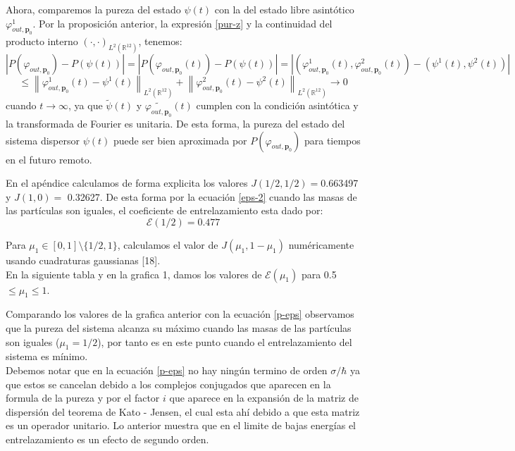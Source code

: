 \documentclass[12pt]{book}
\numberwithin{equation}{chapter}
\def\R{\mathbb{R}}
\def\E{\mathcal{E}}
\def\rar{\rightarrow}
\def\vp{\varphi}
\def\P{\mathbf{p}}
\begin{document}
Ahora, comparemos la pureza del estado $\psi(t)$ con la del estado libre asint\'otico $\vp_{out,\P_{0}}^{1}$. Por la proposici\'on anterior, la expresi\'on \eqref{pur-z} y la continuidad del producto interno $(\cdot , \cdot)_{ L^{2}(\R^{12}) }$, tenemos:
$$ \left|P(\vp_{out,\P_{0}}) - P(\psi(t)) \right| = \left| P(\vp_{out,\P_{0}}(t)) - P(\psi(t)) \right| = \left| (\vp_{out,\P_{0}}^{1}(t) , \vp_{out,\P_{0}}^{2}(t)) - (\psi^{1}(t),\psi^{2}(t)) \right| $$
$$ \leq \left\| \vp_{out,\P_{0}}^{1}(t) - \psi^{1}(t) \right\|_{L^{2}(\R^{12})} + \left\| \vp_{out,\P_{0}}^{2}(t) -  \psi^{2}(t) \right\|_{L^{2}(\R^{12})} \rar 0 $$
cuando $t \rar \infty$, ya que $\tilde{\psi}(t)$ y $\tilde{\vp_{out,\P_{0}}}(t)$ cumplen con la condici\'on asint\'otica y la transformada de Fourier es unitaria.
De esta forma, la pureza del estado del sistema dispersor $\psi(t)$ puede ser bien aproximada por $P(\vp_{out,\P_{0}})$ para tiempos en el futuro remoto.\\

\newpage

En el ap\'endice calculamos de forma explicita los valores $ J(1/2,1/2)=$0.663497 y $ J(1,0)=$ 0.32627. De esta forma por la ecuaci\'on \eqref{eps-2} cuando las masas de las part\'iculas son iguales, el coeficiente de entrelazamiento esta dado por:
$$ \E(1/2)= 0.477 $$

Para $\mu_{1} \in [0,1] \setminus \{ 1/2,1 \}$, calculamos el valor de $J(\mu_{1},1-\mu_{1})$ num\'ericamente usando cuadraturas gaussianas [18].\\

En la siguiente tabla y en la grafica 1, damos los valores de $\E(\mu_{1})$ para 0.5$\leq \mu_{1} \leq 1 $.\\

\vspace{3 mm}


\newpage


Comparando los valores de la grafica anterior con la ecuaci\'on \eqref{p-eps} observamos que la pureza del sistema alcanza su m\'aximo cuando las masas de las part\'iculas son iguales ($\mu_{1}=1/2$), por tanto es en este punto cuando el entrelazamiento del sistema es m\'inimo.\\

Debemos notar que en la ecuaci\'on \eqref{p-eps} no hay ning\'un termino de orden $\sigma/\hbar$ ya que estos se cancelan debido a los complejos conjugados que aparecen en la formula de la pureza y por el factor $i$ que aparece en la expansi\'on de la matriz de dispersi\'on del teorema de Kato - Jensen, el cual esta ah\'i debido a que esta matriz es un operador unitario. Lo anterior muestra que en el limite de bajas energ\'ias el entrelazamiento es un efecto de segundo orden.\\
\end{document}
